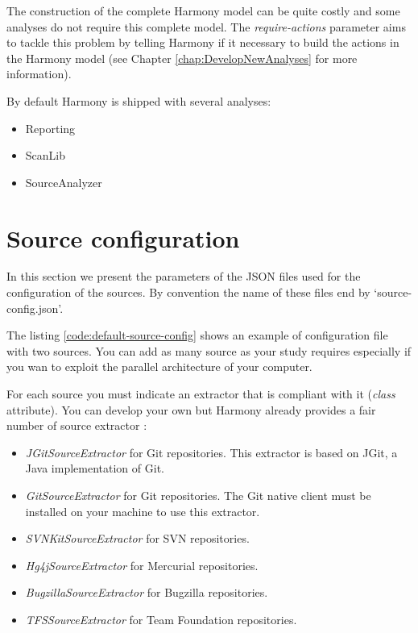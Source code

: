 		
		The construction of the complete Harmony model can be quite costly and some analyses do not require this complete model. The \emph{require-actions} parameter aims to tackle this problem by telling Harmony if it necessary to build the actions in the Harmony model (see Chapter \ref{chap:DevelopNewAnalyses} for more information).
		
		By default Harmony is shipped with several analyses:
			\begin{itemize}
				\item Reporting
				\item ScanLib
				\item SourceAnalyzer
			\end{itemize}

	
	\section{Source configuration}\label{sec:advancedUse:sourceConfig}
In this section we present the parameters of the JSON files used for the configuration of the sources. By convention the name of these files end by `source-config.json'.

The listing \ref{code:default-source-config} shows an example of configuration file with two sources. You can add as many source as your study requires especially if you wan to exploit the parallel architecture of your computer. 


For each source you must indicate an extractor that is compliant with it (\emph{class} attribute). You can develop your own but Harmony already provides a fair number of source extractor :
		\begin{itemize}
			\item \emph{JGitSourceExtractor} for Git repositories. This extractor is based on JGit, a Java implementation of Git.
			\item \emph{GitSourceExtractor} for Git repositories. The Git native client must be installed on your machine to use this extractor.
			\item \emph{SVNKitSourceExtractor} for SVN repositories.
			\item \emph{Hg4jSourceExtractor} for Mercurial repositories.
			\item \emph{BugzillaSourceExtractor} for Bugzilla repositories.
			\item \emph{TFSSourceExtractor} for Team Foundation repositories.
		\end{itemize}


	
	